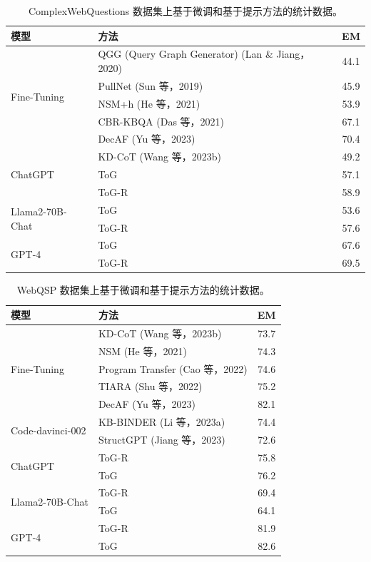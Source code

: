 \documentclass[11pt,UTF8,fontset=fandol]{ctexart}
\begin{document}
\begin{table}[H]\centering
\caption{ComplexWebQuestions 数据集上基于微调和基于提示方法的统计数据。}
\label{tab:10}
\small
\begin{tabular}{llc}
\toprule
模型 & 方法 & EM \\
\midrule
\multirow{5}{*}{Fine-Tuning} & QGG (Query Graph Generator) (Lan \& Jiang，2020) & 44.1 \\
& PullNet (Sun 等，2019) & 45.9 \\
& NSM+h (He 等，2021) & 53.9 \\
& CBR-KBQA (Das 等，2021) & 67.1 \\
& DecAF (Yu 等，2023) & 70.4 \\
\midrule
\multirow{3}{*}{ChatGPT} & KD-CoT (Wang 等，2023b) & 49.2 \\
& ToG & 57.1 \\
& ToG-R & 58.9 \\
\midrule
\multirow{2}{*}{Llama2-70B-Chat} & ToG & 53.6 \\
& ToG-R & 57.6 \\
\midrule
\multirow{2}{*}{GPT-4} & ToG & 67.6 \\
& ToG-R & 69.5 \\
\bottomrule
\end{tabular}
\end{table}

\begin{table}[H]\centering
\caption{WebQSP 数据集上基于微调和基于提示方法的统计数据。}
\label{tab:11}
\small
\begin{tabular}{llc}
\toprule
模型 & 方法 & EM \\
\midrule
\multirow{5}{*}{Fine-Tuning} & KD-CoT (Wang 等，2023b) & 73.7 \\
& NSM (He 等，2021) & 74.3 \\
& Program Transfer (Cao 等，2022) & 74.6 \\
& TIARA (Shu 等，2022) & 75.2 \\
& DecAF (Yu 等，2023) & 82.1 \\
\midrule
\multirow{2}{*}{Code-davinci-002} & KB-BINDER (Li 等，2023a) & 74.4 \\
& StructGPT (Jiang 等，2023) & 72.6 \\
\midrule
\multirow{2}{*}{ChatGPT} & ToG-R & 75.8 \\
& ToG & 76.2 \\
\midrule
\multirow{2}{*}{Llama2-70B-Chat} & ToG-R & 69.4 \\
& ToG & 64.1 \\
\midrule
\multirow{2}{*}{GPT-4} & ToG-R & 81.9 \\
& ToG & 82.6 \\
\bottomrule
\end{tabular}
\end{table}
\end{document}
